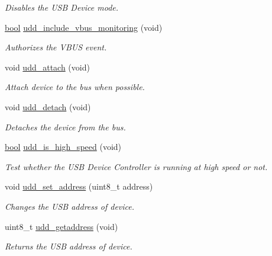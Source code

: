 \begin{DoxyCompactItemize}
\begin{DoxyCompactList}\small\item\em Disables the U\-S\-B Device mode. \end{DoxyCompactList}\item 
\hyperlink{group__group__xmega__utils_ga97a80ca1602ebf2303258971a2c938e2}{bool} \hyperlink{group__udd__xmega__usb__group_gaa4cac8c35ae056e26cf4ab5b426bbe09}{udd\-\_\-include\-\_\-vbus\-\_\-monitoring} (void)
\begin{DoxyCompactList}\small\item\em Authorizes the V\-B\-U\-S event. \end{DoxyCompactList}\item 
void \hyperlink{group__udd__xmega__usb__group_ga7a7c0d9236c922c2af33c6702565a99f}{udd\-\_\-attach} (void)
\begin{DoxyCompactList}\small\item\em Attach device to the bus when possible. \end{DoxyCompactList}\item 
void \hyperlink{group__udd__xmega__usb__group_ga03e59eaa264f1dbe5a52559311d0520e}{udd\-\_\-detach} (void)
\begin{DoxyCompactList}\small\item\em Detaches the device from the bus. \end{DoxyCompactList}\item 
\hyperlink{group__group__xmega__utils_ga97a80ca1602ebf2303258971a2c938e2}{bool} \hyperlink{group__udd__xmega__usb__group_ga85f403ddb78776b1ba014dafd3ffec2c}{udd\-\_\-is\-\_\-high\-\_\-speed} (void)
\begin{DoxyCompactList}\small\item\em Test whether the U\-S\-B Device Controller is running at high speed or not. \end{DoxyCompactList}\item 
void \hyperlink{group__udd__xmega__usb__group_ga05da762e0faf9d478e532de40afa71f6}{udd\-\_\-set\-\_\-address} (uint8\-\_\-t address)
\begin{DoxyCompactList}\small\item\em Changes the U\-S\-B address of device. \end{DoxyCompactList}\item 
uint8\-\_\-t \hyperlink{group__udd__xmega__usb__group_gaebd36638d482f6df00a8aff006ef2246}{udd\-\_\-getaddress} (void)
\begin{DoxyCompactList}\small\item\em Returns the U\-S\-B address of device. \end{DoxyCompactList}\item 

\end{DoxyCompactItemize}

